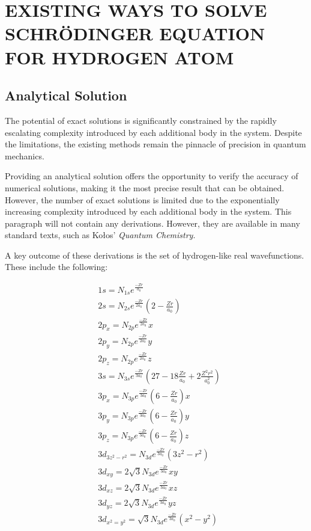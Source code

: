 \section{EXISTING WAYS TO SOLVE SCHRÖDINGER EQUATION FOR HYDROGEN ATOM}

\subsection{Analytical Solution}

The potential of exact solutions is significantly constrained by the rapidly escalating complexity introduced by each additional body in the system. 
Despite the limitations, the existing methods remain the pinnacle of precision in quantum mechanics.

Providing an analytical solution offers the opportunity to verify the accuracy of numerical solutions, making it the most precise result that can be obtained. However, the number of exact solutions is limited due to the exponentially increasing complexity introduced by each additional body in the system. This paragraph will not contain any derivations. However, they are available in many standard texts, such as Kołos' \textit{Quantum Chemistry}.

A key outcome of these derivations is the set of hydrogen-like real wavefunctions\cite{kolos1978}. These include the following:

\begin{equation}
	\label{eq211}
	\begin{aligned}
		& 1s = N_{1s}e^{\frac{-Zr}{a_0}} \\
		& 2s = N_{2s}e^{\frac{-Zr}{2a_0}}(2 - \frac{Zr}{a_0}) \\
		& 2p_x =  N_{2p}e^{\frac{-Zr}{2a_0}}x \\
		& 2p_y =  N_{2p}e^{\frac{-Zr}{2a_0}}y \\
		& 2p_z =  N_{2p}e^{\frac{-Zr}{2a_0}}z \\		
		& 3s = N_{3s}e^{\frac{-Zr}{3a_0}}(27 - 18\frac{Zr}{a_0} + 2\frac{Z^2r^2}{a^2_0}) \\
		& 3p_x =  N_{3p}e^{\frac{-Zr}{3a_0}}(6-\frac{Zr}{a_0})x \\
		& 3p_y =  N_{3p}e^{\frac{-Zr}{3a_0}}(6-\frac{Zr}{a_0})y \\
		& 3p_z =  N_{3p}e^{\frac{-Zr}{3a_0}}(6-\frac{Zr}{a_0})z \\
		& 3d_{3z^2-r^2} =  N_{3d}e^{\frac{-Zr}{3a_0}}(3z^2-r^2) \\
		& 3d_{xy} =  2\sqrt{3}N_{3d}e^{\frac{-Zr}{3a_0}}xy \\
		& 3d_{xz} =  2\sqrt{3}N_{3d}e^{\frac{-Zr}{3a_0}}xz \\
		& 3d_{yz} =  2\sqrt{3}N_{3d}e^{\frac{-Zr}{3a_0}}yz \\
		& 3d_{x^2=y^2} =  \sqrt{3}N_{3d}e^{\frac{-Zr}{3a_0}}(x^2-y^2) \\
	\end{aligned}
\end{equation}

